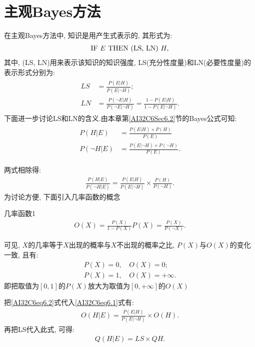 \section{主观Bayes方法}
在主观Bayes方法中, 知识是用产生式表示的, 其形式为:
\begin{align}
   \textup{IF} \,\, E\,\,  \textup{THEN}\,\,  \textup{(LS, LN)} \,\,  H,
\end{align}
其中, (LS, LN)用来表示该知识的知识强度, LS(充分性度量)和LN(必要性度量)的表示形式分别为:
\begin{align}
\begin{aligned}
LS &=\frac{P(E | H)}{P(E | \neg H)}; \\
LN &=\frac{P(\neg E | H)}{P(\neg E | \neg H)}=\frac{1-P(E | H)}{1-P(E | \neg H)}.
\end{aligned}
\end{align}
下面进一步讨论LS和LN的含义.由本章第\ref{AI32C6Sec6.2}节的Bayes公式可知:
\begin{align}\label{AI32C6eq6.2}
  \begin{aligned}
  P(H | E) &=\frac{P(E | H) \times P(H)}{P(E)} \\ P(\neg H | E) &=\frac{P(E | \neg H) \times P(\neg H)}{P(E)}.
  \end{aligned}
\end{align}

两式相除得:
\begin{align}
  \frac{P(H | E)}{P(\neg H | E)}=\frac{P(E | H)}{P(E | \neg H)} \times \frac{P(H)}{P(\neg H)}.
\end{align}
为讨论方便, 下面引入几率函数的概念
\begin{mydef}{几率函数}{1}
\begin{align}
  O(X)=\frac{P(X)}{1-P(X)} P(X)=\frac{P(X)}{P(\neg X)}.
\end{align}
\end{mydef}

可见, $X$的几率等于$X$出现的概率与$X$不出现的概率之比, $P(X)$与$O(X)$的变化一致, 且有:
\begin{align}\label{AI32C6eq6.1}
P(X)=0,&\,O(X)=0;\\
P(X)=1,&\,O(X)=+\infty.
\end{align}
即把取值为$[0,1]$的$P(X)$放大为取值为$[0,+\infty]$的$O(X)$

把\eqref{AI32C6eq6.2}式代入\eqref{AI32C6eq6.1}式有:
\begin{align}
  O(H | E)=\frac{P(E | H)}{P(E | \neg H)} \times O(H).
\end{align}
再把LS代入此式, 可得:
\begin{align}
  Q(H | E)=LS \times QH.
\end{align}

